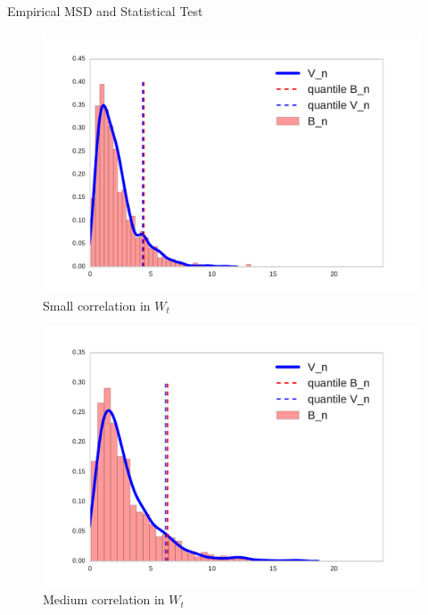 \begin{frame}
\begin{columns}
\begin{column}{.33\linewidth}
\begin{block}{Empirical MSD and Statistical Test}
\begin{center}
  \begin{minipage}{.49\linewidth}
\begin{figure}
 \includegraphics[width=\textwidth]{../../presentation/img/bootstrapWorks1.pdf}
 \caption{Small correlation in $W_t$} 
\end{figure}
 \end{minipage}
  \begin{minipage}{.49\linewidth}
\begin{figure}
 \includegraphics[width=\textwidth]{../../presentation/img/bootstrapWorks4.pdf}
 \caption{Medium correlation in $W_t$} 
\end{figure}
  \end{minipage}
\end{center}





\end{block}
\end{column}
\end{columns}
\end{frame}
